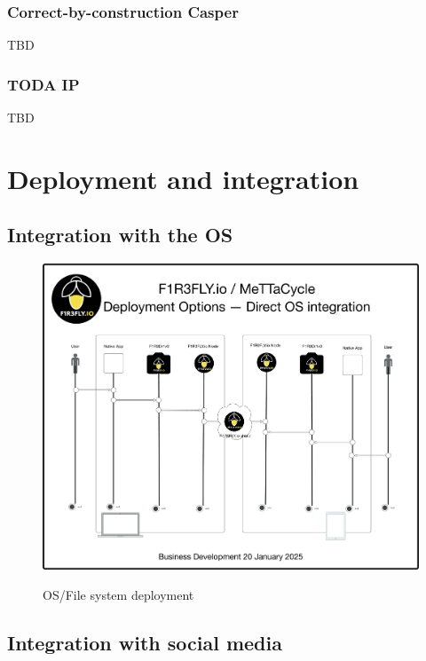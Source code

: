 \documentclass{article}
\begin{document}

\subsubsection{Correct-by-construction Casper}

TBD

\subsubsection{TODA IP}

TBD

\section{Deployment and integration}
\label{Deployment and integration}

\subsection{Integration with the OS}

\begin{figure}
  \centering
  \includegraphics[scale=0.15]{MeTTaCycleArchitecture2025OSDeployment.pdf} \\
  \caption{OS/File system deployment}
  \label{MCArch2025OSDeployment}
\end{figure}

\subsection{Integration with social media}
\end{document}
